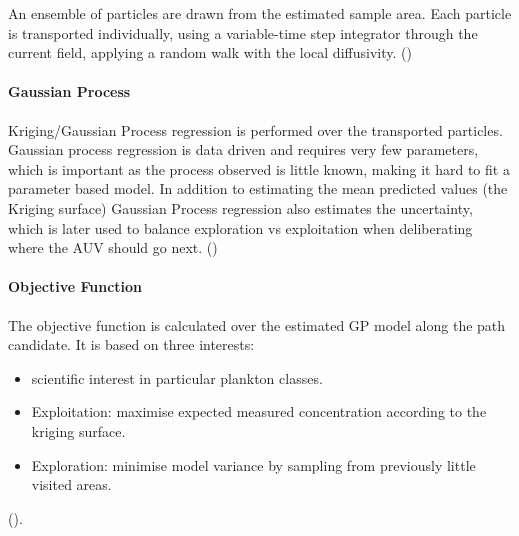 \documentclass[conference]{IEEEtran}
\newcommand{\cmt}[1]{{\color{red}{#1}}}
\begin{document}
An ensemble of particles are drawn from the estimated sample area.
Each particle is transported individually, using a variable-time step
integrator through the current field, applying a random walk with the
local diffusivity. (\cmt{Cite again})

\paragraph{Gaussian Process}

Kriging/Gaussian Process regression is performed over the transported
particles.  Gaussian process regression is data driven and requires
very few parameters, which is important as the process observed is
little known, making it hard to fit a parameter based model.  In
addition to estimating the mean predicted values (the Kriging surface)
Gaussian Process regression also estimates the uncertainty, which is
later used to balance exploration vs exploitation when deliberating
where the AUV should go next. (\cmt{Cite. This is confusing; are you
  using a GP with the hydro-dynamic flow? I suspect what you want to
  say is, once a hot-spot has been identified, then to understand its
  spatial structure (size, extant and potentially as a result, the
  community (of the micro-organism) structure), one needs to do a GP
  (a la, work in Runde). Right?})

\paragraph{Objective Function}

The objective function is calculated over the estimated GP model along
the path candidate.  It is based on three interests:

\begin{itemize}

    \item scientific interest in particular plankton classes. 
    \item Exploitation: maximise expected measured concentration
      according to the kriging surface. 
    \item Exploration: minimise model variance by sampling from
      previously little visited areas. 

\end{itemize}

(\cmt{This is very abrupt. You want to say where the GP is being used,
  but after you talk about the plan-exec, since it is the plan-exec
  component which determines when to activate the GP and modify the
  kernel. There should be a nice flow between when you introduce the
  GP with the rest of the para's below. And after Plan/Exec.}).
\end{document}
